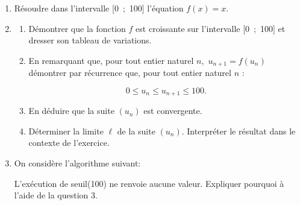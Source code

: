 \documentclass[10pt,a4paper]{article}
\begin{document}
\begin{enumerate}[resume]
    \item Résoudre dans l'intervalle [0~;~100] l'équation $f(x) = x$.
    \item
          \begin{enumerate}
              \item Démontrer que la fonction $f$ est croissante sur l'intervalle [0~;~100] et dresser son tableau de variations.
              \item En remarquant que, pour tout entier naturel $n$,\, $u_{n+1} = f\left(u_n\right)$ démontrer par récurrence que, pour tout entier naturel $n$ :

                    \[0 \leqslant u_n \leqslant u_{n+1} \leqslant 100.\]

              \item En déduire que la suite $\left(u_n\right)$ est convergente.
              \item Déterminer la limite $\ell$ de la suite $\left(u_n\right)$. Interpréter le résultat dans le contexte de l'exercice.
          \end{enumerate}
    \item On considère l'algorithme suivant:

          \begin{center}
          \end{center}

          L'exécution de seuil(100) ne renvoie aucune valeur. Expliquer pourquoi à l'aide de la question 3.
\end{enumerate}
\end{document}
